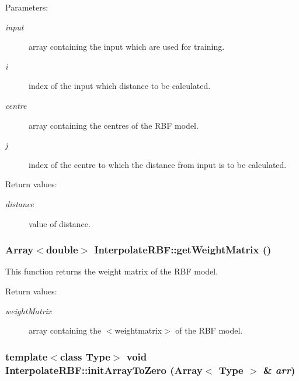 \begin{Desc}
\item[Parameters:]
\begin{description}
\item[{\em input}]array containing the input which are used for training. \item[{\em i}]index of the input which distance to be calculated. \item[{\em centre}]array containing the centres of the RBF model. \item[{\em j}]index of the centre to which the distance from input is to be calculated. \end{description}
\end{Desc}
\begin{Desc}
\item[Return values:]
\begin{description}
\item[{\em distance}]value of distance.\end{description}
\end{Desc}
\subsubsection{\setlength{\rightskip}{0pt plus 5cm}Array$<$double$>$ Interpolate\-RBF::get\-Weight\-Matrix ()}\label{classInterpolateRBF_a12}


This function returns the weight matrix of the RBF model. 

\begin{Desc}
\item[Return values:]
\begin{description}
\item[{\em weight\-Matrix}]array containing the $<$weightmatrix$>$ of the RBF model.\end{description}
\end{Desc}
\subsubsection{\setlength{\rightskip}{0pt plus 5cm}template$<$class Type$>$ void Interpolate\-RBF::init\-Array\-To\-Zero (Array$<$ Type $>$ \& {\em arr})\hspace{0.3cm}{\tt  [inline, static]}}\label{classInterpolateRBF_e8}


